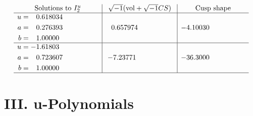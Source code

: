 \documentclass[1p]{elsarticle_modified}
\theoremstyle{definition}
\newcommand{\I}{\sqrt{-1}}
\begin{document}
$$\begin{array}{c|c|c}  
\text{Solutions to }I^u_{2}& \I (\text{vol} + \sqrt{-1}CS) & \text{Cusp shape}\\
 \hline 
\begin{aligned}
u &= \phantom{-}0.618034\phantom{ +0.000000I} \\
a &= \phantom{-}0.276393\phantom{ +0.000000I} \\
b &= \phantom{-}1.00000\phantom{ +0.000000I}\end{aligned}
 & \phantom{-}0.657974\phantom{ +0.000000I} & -4.10030\phantom{ +0.000000I} \\ \hline\begin{aligned}
u &= -1.61803\phantom{ +0.000000I} \\
a &= \phantom{-}0.723607\phantom{ +0.000000I} \\
b &= \phantom{-}1.00000\phantom{ +0.000000I}\end{aligned}
 & -7.23771\phantom{ +0.000000I} & -36.3000\phantom{ +0.000000I}\\
 \hline 
 \end{array}$$\newpage
\newpage\renewcommand{\arraystretch}{1}
\centering \section*{ III. u-Polynomials}
\end{document}
